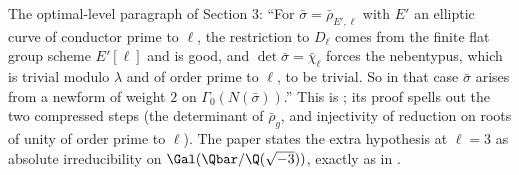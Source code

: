 \begin{paperlink}
The optimal-level paragraph of Section 3: ``For $\bar\sigma=\bar\rho_{E',\ell}$ with $E'$ an elliptic curve of conductor prime to $\ell$, the restriction to $D_\ell$ comes from
the finite flat group scheme $E'[\ell]$ and is good, and $\det\bar\sigma=\bar\chi_\ell$ forces the nebentypus, which is trivial modulo $\lambda$ and of order prime to $\ell$,
to be trivial. So in that case $\bar\sigma$ arises from a newform of weight $2$ on $\Gamma_0(N(\bar\sigma))$.'' This is ; its proof
spells out the two compressed steps (the determinant of $\bar\rho_g$, and injectivity of reduction on roots of unity of order prime to $\ell$). The
paper states the extra hypothesis at $\ell=3$ as absolute irreducibility on $\Gal(\Qbar/\Q(\sqrt{-3}))$, exactly as in .
\end{paperlink}

